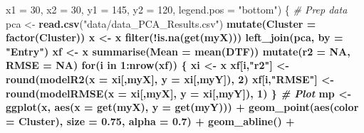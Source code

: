 \documentclass[
]{article}
\newenvironment{Shaded}{\begin{snugshade}}{\end{snugshade}}
\newcommand{\CommentTok}[1]{\textcolor[rgb]{0.56,0.35,0.01}{\textit{#1}}}
\newcommand{\ControlFlowTok}[1]{\textcolor[rgb]{0.13,0.29,0.53}{\textbf{#1}}}
\newcommand{\DataTypeTok}[1]{\textcolor[rgb]{0.13,0.29,0.53}{#1}}
\newcommand{\DecValTok}[1]{\textcolor[rgb]{0.00,0.00,0.81}{#1}}
\newcommand{\FloatTok}[1]{\textcolor[rgb]{0.00,0.00,0.81}{#1}}
\newcommand{\KeywordTok}[1]{\textcolor[rgb]{0.13,0.29,0.53}{\textbf{#1}}}
\newcommand{\NormalTok}[1]{#1}
\newcommand{\OperatorTok}[1]{\textcolor[rgb]{0.81,0.36,0.00}{\textbf{#1}}}
\newcommand{\OtherTok}[1]{\textcolor[rgb]{0.56,0.35,0.01}{#1}}
\newcommand{\StringTok}[1]{\textcolor[rgb]{0.31,0.60,0.02}{#1}}
\begin{document}
\begin{Shaded}
\begin{Highlighting}[]
{{{{                       \DataTypeTok{x1 =} \DecValTok{30}\NormalTok{, }\DataTypeTok{x2 =} \DecValTok{30}\NormalTok{, }\DataTypeTok{y1 =} \DecValTok{145}\NormalTok{, }\DataTypeTok{y2 =} \DecValTok{120}\NormalTok{, }\DataTypeTok{legend.pos =} \StringTok{"bottom"}\NormalTok{) \{}
  \CommentTok{# Prep data}
\NormalTok{  pca <-}\StringTok{ }\KeywordTok{read.csv}\NormalTok{(}\StringTok{"data/data_PCA_Results.csv"}\NormalTok{) }\OperatorTok{%
\StringTok{    }\KeywordTok{mutate}\NormalTok{(}\DataTypeTok{Cluster =} \KeywordTok{factor}\NormalTok{(Cluster))}
\NormalTok{  x <-}\StringTok{ }\NormalTok{x }\OperatorTok{%
\StringTok{    }\KeywordTok{filter}\NormalTok{(}\OperatorTok{!}\KeywordTok{is.na}\NormalTok{(}\KeywordTok{get}\NormalTok{(myX))) }\OperatorTok{%
\StringTok{    }\KeywordTok{left_join}\NormalTok{(pca, }\DataTypeTok{by =} \StringTok{"Entry"}\NormalTok{)}
\NormalTok{  xf <-}\StringTok{ }\NormalTok{x }\OperatorTok{%
\StringTok{    }\KeywordTok{summarise}\NormalTok{(}\DataTypeTok{Mean =} \KeywordTok{mean}\NormalTok{(DTF)) }\OperatorTok{%
\StringTok{    }\KeywordTok{mutate}\NormalTok{(}\DataTypeTok{r2 =} \OtherTok{NA}\NormalTok{, }\DataTypeTok{RMSE =} \OtherTok{NA}\NormalTok{)}
  \ControlFlowTok{for}\NormalTok{(i }\ControlFlowTok{in} \DecValTok{1}\OperatorTok{:}\KeywordTok{nrow}\NormalTok{(xf)) \{}
\NormalTok{    xi <-}\StringTok{ }\NormalTok{x }\OperatorTok{%
\NormalTok{    xf[i,}\StringTok{"r2"}\NormalTok{]   <-}\StringTok{ }\KeywordTok{round}\NormalTok{(}\KeywordTok{modelR2}\NormalTok{(}\DataTypeTok{x =}\NormalTok{ xi[,myX],   }\DataTypeTok{y =}\NormalTok{ xi[,myY]), }\DecValTok{2}\NormalTok{)}
\NormalTok{    xf[i,}\StringTok{"RMSE"}\NormalTok{] <-}\StringTok{ }\KeywordTok{round}\NormalTok{(}\KeywordTok{modelRMSE}\NormalTok{(}\DataTypeTok{x =}\NormalTok{ xi[,myX], }\DataTypeTok{y =}\NormalTok{ xi[,myY]), }\DecValTok{1}\NormalTok{)}
\NormalTok{  \}}
  \CommentTok{# Plot}
\NormalTok{  mp <-}\StringTok{ }\KeywordTok{ggplot}\NormalTok{(x, }\KeywordTok{aes}\NormalTok{(}\DataTypeTok{x =} \KeywordTok{get}\NormalTok{(myX), }\DataTypeTok{y =} \KeywordTok{get}\NormalTok{(myY))) }\OperatorTok{+}
\StringTok{    }\KeywordTok{geom_point}\NormalTok{(}\KeywordTok{aes}\NormalTok{(}\DataTypeTok{color =}\NormalTok{ Cluster), }\DataTypeTok{size =} \FloatTok{0.75}\NormalTok{, }\DataTypeTok{alpha =} \FloatTok{0.7}\NormalTok{) }\OperatorTok{+}\StringTok{ }\KeywordTok{geom_abline}\NormalTok{() }\OperatorTok{+}
}}}}}}}}}}
\end{Highlighting}
\end{Shaded}
\end{document}
